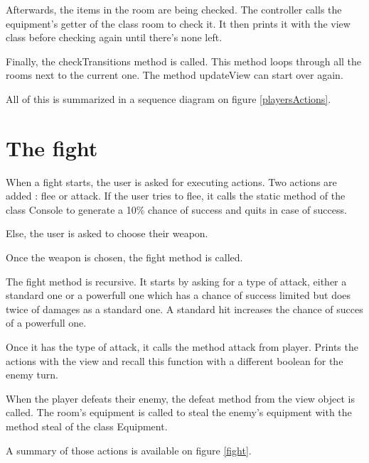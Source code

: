 \documentclass[11pt]{extarticle}
\begin{document}
Afterwards, the items in the room are being checked. The controller calls the equipment's getter of the class room to check it. It then prints it with the view class before checking again until there's none left. 

Finally, the checkTransitions method is called. This method loops through all the rooms next to the current one. The method updateView can start over again.

All of this is summarized in a sequence diagram on figure \ref{playersActions}.

\section{The fight}

When a fight starts, the user is asked for executing actions. Two actions are added : flee or attack. If the user tries to flee, it calls the static method of the class Console to generate a 10\% chance of success and quits in case of success.

Else, the user is asked to choose their weapon. 

Once the weapon is chosen, the fight method is called. 

The fight method is recursive. It starts by asking for a type of attack, either a standard one or a powerfull one which has a chance of success limited but does twice of damages as a standard one. A standard hit increases the chance of succes of a powerfull one. 

Once it has the type of attack, it calls the method attack from player. Prints the actions with the view and recall this function with a different boolean for the enemy turn. 

When the player defeats their enemy, the defeat method from the view object is called. The room's equipment is called to steal the enemy's equipment with the method steal of the class Equipment.

A summary of those actions is available on figure \ref{fight}.
\end{document}
